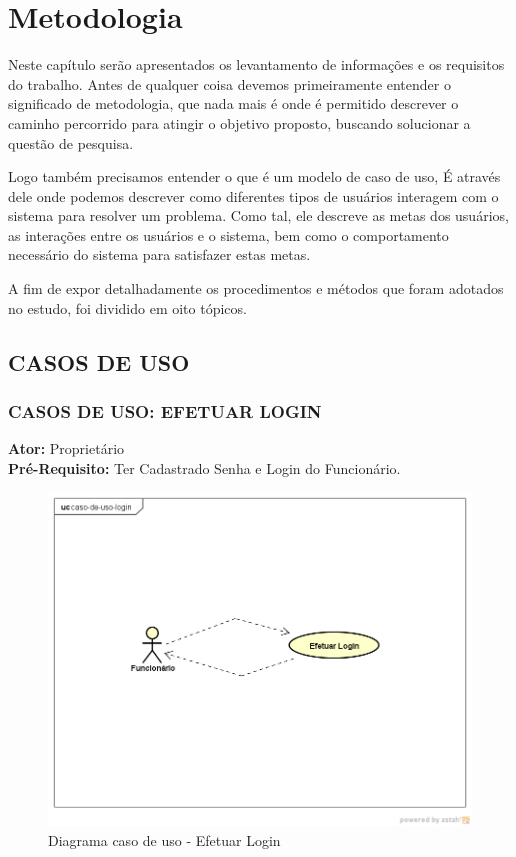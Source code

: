 \chapter{Metodologia}
Neste capítulo serão apresentados os levantamento de informações e os requisitos do trabalho. Antes de qualquer coisa devemos primeiramente entender o significado de metodologia, que nada mais é onde é permitido descrever o caminho percorrido para atingir o objetivo proposto, buscando solucionar a questão de pesquisa.

Logo também precisamos entender o que é um modelo de caso de uso, É através dele onde podemos descrever como diferentes tipos de usuários interagem com o sistema para resolver um problema. Como tal, ele descreve as metas dos usuários, as interações entre os usuários e o sistema, bem como o comportamento necessário do sistema para satisfazer estas metas.

A fim de expor detalhadamente os procedimentos e métodos que foram adotados no
estudo, foi dividido em oito tópicos.

\section{CASOS DE USO}
\subsection{CASOS DE USO: EFETUAR LOGIN}
\begin{flushleft}
\textbf{Ator:}  Proprietário
\\
\textbf{Pré-Requisito:} Ter Cadastrado Senha e Login do Funcionário.
\end{flushleft}

\begin{figure}[htb]
	\caption{\label{fig_login} Diagrama caso de uso - Efetuar Login}
	\begin{center}
	    \includegraphics[width=0.7\linewidth]{imagens/caso-de-uso-login.png}
	\end{center}
\end{figure}

